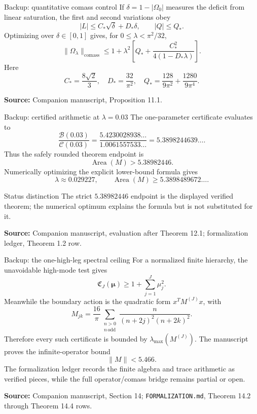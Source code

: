 \documentclass[11pt,aspectratio=169,usepdftitle=false]{beamer}
\newcommand{\Area}{\operatorname{Area}}
\newcommand{\sourcefoot}[1]{\par\vfill{\tiny\color{Slate}\textbf{Source:} #1}}
\begin{document}
\begin{frame}{Backup: quantitative comass control}\label{bk:comass-bound}
  If $\delta=1-|\Omega_0|$ measures the deficit from linear saturation, the
  first and second variations obey
  \[
    |L|\le C_*\sqrt\delta+D_*\delta,
    \qquad |Q|\le Q_*.
  \]
  Optimizing over $\delta\in[0,1]$ gives, for $0\le\lambda<\pi^2/32$,
  \[
    \|\Omega_\lambda\|_{\mathrm{comass}}
    \le1+\lambda^2\left[
    Q_*+\frac{C_*^2}{4(1-D_*\lambda)}
    \right].
  \]
  Here
  \[
    C_*=\frac{8\sqrt2}{3},\quad
    D_*=\frac{32}{\pi^2},\quad
    Q_*=\frac{128}{9\pi^2}+\frac{1280}{9\pi^4}.
  \]
  \sourcefoot{Companion manuscript, Proposition 11.1.}
\end{frame}

\begin{frame}{Backup: certified arithmetic at $\lambda=0.03$}\label{bk:lambda}
  The one-parameter certificate evaluates to
  \[
    \frac{\mathcal B(0.03)}{\mathcal C(0.03)}
    =\frac{5.4230028938\ldots}{1.0061557533\ldots}
    =5.3898244639\ldots.
  \]
  Thus the safely rounded theorem endpoint is
  \[
    \boxed{\Area(M)>5.38982446.}
  \]
  Numerically optimizing the explicit lower-bound formula gives
  \[
    \lambda\approx0.029227,
    \qquad \Area(M)\ge5.3898489672\ldots.
  \]
  \begin{alertblock}{Status distinction}
    The strict $5.38982446$ endpoint is the displayed verified theorem; the
    numerical optimum explains the formula but is not substituted for it.
  \end{alertblock}
  \sourcefoot{Companion manuscript, evaluation after Theorem 12.1; formalization ledger, Theorem 1.2 row.}
\end{frame}

\begin{frame}{Backup: the one-high-leg spectral ceiling}\label{bk:ceiling}
  For a normalized finite hierarchy, the unavoidable high-mode test gives
  \[
    \mathfrak C_J(\boldsymbol\mu)\ge1+\sum_{j=1}^{J}\mu_j^2.
  \]
  Meanwhile the boundary action is the quadratic form $x^TM^{(J)}x$, with
  \[
    M_{jk}=\frac{16}{\pi}
    \sum_{\substack{n>0\\ n\,\mathrm{odd}}}
    \frac{n}{(n+2j)^2(n+2k)^2}.
  \]
  Therefore every such certificate is bounded by
  $\lambda_{\max}(M^{(J)})$. The manuscript proves the infinite-operator bound
  \[
    \boxed{\|M\|<5.466.}
  \]
  \small The formalization ledger records the finite algebra and trace
  arithmetic as verified pieces, while the full operator/comass bridge remains
  partial or open.
  \sourcefoot{Companion manuscript, Section 14; \texttt{FORMALIZATION.md}, Theorem 14.2 through Theorem 14.4 rows.}
\end{frame}
\end{document}
